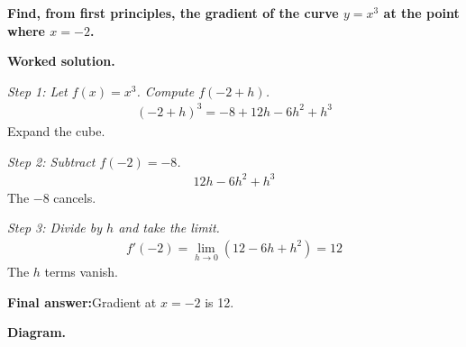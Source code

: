 \documentclass[11pt]{article}
\newcommand{\question}[1]{\par\medskip\noindent\textbf{#1}\par}
\begin{document}
\question{Find, from first principles, the gradient of the curve \( y = x^3 \) at the point where \( x = -2 \).}

\textbf{Worked solution.}

\textit{Step 1: Let \( f(x) = x^3 \). Compute \( f(-2+h) \).}
\[\begin{gathered}
(-2+h)^3 = -8 + 12h - 6h^2 + h^3
\end{gathered}\]
Expand the cube.

\textit{Step 2: Subtract \( f(-2) = -8 \).}
\[\begin{gathered}
12h - 6h^2 + h^3
\end{gathered}\]
The \( -8 \) cancels.

\textit{Step 3: Divide by \( h \) and take the limit.}
\[\begin{gathered}
f'(-2) = \lim_{h \to 0}(12 - 6h + h^2) = 12
\end{gathered}\]
The \( h \) terms vanish.

\begin{answerbox}
\textbf{Final answer:}\quad Gradient at \(\displaystyle  x = -2 \) is 12.
\end{answerbox}
\textbf{Diagram.}
\end{document}
